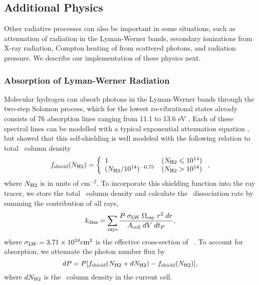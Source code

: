 \documentclass[useAMS,usenatbib]{mn2e}
\begin{document}
\subsection{Additional Physics}
\label{sec:addphysics}

Other radiative processes can also be important in some situations,
such as attenuation of radiation in the Lyman-Werner bands, secondary
ionizations from X-ray radiation, Compton heating of from scattered
photons, and radiation pressure.  We describe our implementation of
these physics next.

\subsubsection{Absorption of Lyman-Werner Radiation}

Molecular hydrogen can absorb photons in the Lyman-Werner bands
through the two-step Solomon process, which for the lowest
ro-vibrational states already consists of 76 absorption lines ranging
from 11.1 to 13.6 eV \citep{Stecher67, Dalgarno70, Haiman00}.  Each of
these spectral lines can be modelled with a typical exponential
attenuation equation \citep{Ricotti01}, but \citet{Draine96} showed
that this self-shielding is well modeled with the following relation
to total \hh~column density
%
\begin{equation}
  \label{eqn:lwband}
  f_{\rm shield} (N_{\rm H2}) =
  \left\{ \begin{array}{l@{\quad}l}
      1 & (N_{\rm H2} \le 10^{14})\\
      (N_{\rm H2}/10^{14})^{-0.75} & (N_{\rm H2} >
      10^{14})
    \end{array} \right. ,
\end{equation}
where $N_{\rm H2}$ is in units of cm$^{-2}$.  To incorporate this
shielding function into the ray tracer, we store the total \hh~column
density and calculate the \hh~dissociation rate by summing the
contribution of all rays,
%
\begin{equation}
  \label{eqn:lwRT}
  k_{\rm diss} = \sum_{\rm rays} \frac{P \; \sigma_{\rm LW} \;
    \Omega_{\rm ray} \; r^2 \; dr}{A_{\rm cell} \; dV \; dt_P},
\end{equation}
where $\sigma_{\rm LW} = 3.71 \times 10^{18} \mathrm{cm}^2$ is the
effective cross-section of \hh~\citep{Abel97}.  To account for
absorption, we attenuate the photon number flux by
%
\begin{equation}
  \label{eqn:LWdP}
  dP = P [f_{\rm shield}(N_{\rm H2} + dN_{\rm H2}) - f_{\rm shield}(N_{\rm H2})],
\end{equation}
where $dN_{\rm H2}$ is the \hh~column density in the current cell.
\end{document}

